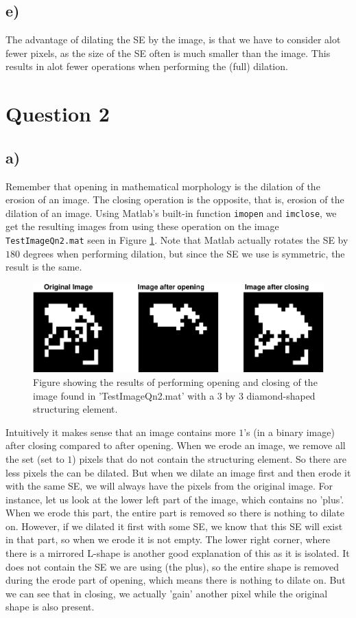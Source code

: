 \documentclass[a4paper]{article}
\begin{document}
\subsection*{e)}
The advantage of dilating the SE by the image, is that we have to consider alot fewer pixels, as the size of the SE often is much smaller than the image. This results in alot fewer operations when performing the (full) dilation.
\section*{Question 2}
\subsection*{a)}
Remember that opening in mathematical morphology is the dilation of the erosion of an image. The closing operation is the opposite, that is, erosion of the dilation of an image. Using Matlab's built-in function \texttt{imopen} and \texttt{imclose}, we get the resulting images from using these operation on the image \texttt{TestImageQn2.mat} seen in Figure \ref{2_1a}. Note that Matlab actually rotates the SE by $180$ degrees when performing dilation, but since the SE we use is symmetric, the result is the same.
\begin{figure}[H]
  \centering
  \captionsetup{justification=centering}
  \includegraphics[width=\textwidth]{q2_1-crop.pdf}
  \caption{Figure showing the results of performing opening and closing of the image found in 'TestImageQn2.mat' with a $3$ by $3$ diamond-shaped structuring element.}
  \label{2_1a}
\end{figure}
Intuitively it makes sense that an image contains more $1$'s (in a binary image) after closing compared to after opening. When we erode an image, we remove all the set (set to $1$) pixels that do not contain the structuring element. So there are less pixels the can be dilated. But when we dilate an image first and then erode it with the same SE, we will always have the pixels from the original image. For instance, let us look at the lower left part of the image, which contains no 'plus'. When we erode this part, the entire part is removed so there is nothing to dilate on. However, if we dilated it first with some SE, we know that this SE will exist in that part, so when we erode it is not empty. The lower right corner, where there is a mirrored L-shape is another good explanation of this as it is isolated. It does not contain the SE we are using (the plus), so the entire shape is removed during the erode part of opening, which means there is nothing to dilate on. But we can see that in closing, we actually 'gain' another pixel while the original shape is also present.
\end{document}

